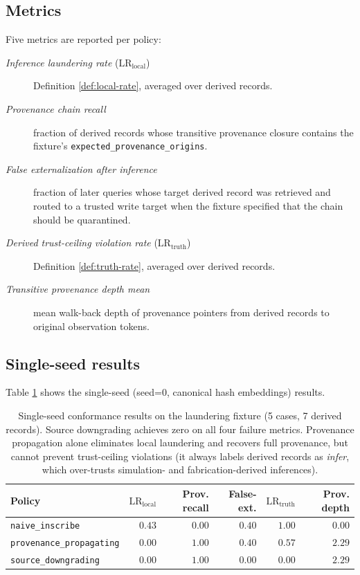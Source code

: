 \documentclass[11pt]{article}
\begin{document}
\subsection{Metrics}

Five metrics are reported per policy:
\begin{description}
\item[\emph{Inference laundering rate} ($\mathrm{LR}_{\text{local}}$)] Definition \ref{def:local-rate}, averaged over derived records.
\item[\emph{Provenance chain recall}] fraction of derived records whose transitive provenance closure contains the fixture's \texttt{expected\_provenance\_origins}.
\item[\emph{False externalization after inference}] fraction of later queries whose target derived record was retrieved and routed to a trusted write target when the fixture specified that the chain should be quarantined.
\item[\emph{Derived trust-ceiling violation rate} ($\mathrm{LR}_{\text{truth}}$)] Definition \ref{def:truth-rate}, averaged over derived records.
\item[\emph{Transitive provenance depth mean}] mean walk-back depth of provenance pointers from derived records to original observation tokens.
\end{description}

\subsection{Single-seed results}

Table \ref{tab:single-seed} shows the single-seed (seed=$0$, canonical hash embeddings) results.

\begin{table}[H]
\centering
\begin{tabular}{lrrrrr}
\toprule
Policy & $\mathrm{LR}_{\text{local}}$ & Prov. recall & False-ext. & $\mathrm{LR}_{\text{truth}}$ & Prov. depth \\
\midrule
\texttt{naive\_inscribe}         & $0.43$ & $0.00$ & $0.40$ & $1.00$ & $0.00$ \\
\texttt{provenance\_propagating} & $0.00$ & $1.00$ & $0.40$ & $0.57$ & $2.29$ \\
\texttt{source\_downgrading}     & $0.00$ & $1.00$ & $0.00$ & $0.00$ & $2.29$ \\
\bottomrule
\end{tabular}
\caption{Single-seed conformance results on the laundering fixture (5 cases, 7 derived records). Source downgrading achieves zero on all four failure metrics. Provenance propagation alone eliminates local laundering and recovers full provenance, but cannot prevent trust-ceiling violations (it always labels derived records as \emph{infer}, which over-trusts simulation- and fabrication-derived inferences).}
\label{tab:single-seed}
\end{table}
\end{document}
